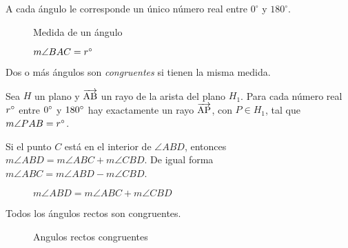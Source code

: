 \begin{postulate}
    A cada ángulo le corresponde un único número real entre $0^{\circ}$ y $180^{\circ}$.

\begin{figure}[!h]
    \centering
    
    \label{fig:angle-measure}
    \caption{Medida de un ángulo}
    \caption{$m\angle{BAC}=r^{\circ}$}
\end{figure}

\end{postulate}

\clearpage

\begin{definition}
    Dos o más ángulos son \textit{congruentes} si tienen la misma medida.
\end{definition}


\begin{postulate}
    Sea $H$ un plano y $\overrightarrow{\rm AB}$ un rayo de la arista del plano $H_1$. Para cada número real $r^{\circ}$ entre $0^{\circ}$ y $180^{\circ}$ hay exactamente un rayo $\overrightarrow{\rm AP}$, con $P \in H_1$, tal que $m\angle{PAB} = r^{\circ}$.

    \begin{figure}[!h]
        \centering
        
        \label{fig:angle-construction}
    \end{figure}
    
\end{postulate}

\begin{postulate}
    Si el punto $C$ está en el interior de $\angle{ABD}$, entonces $m\angle{ABD} = m\angle{ABC} + m\angle{CBD}$. De igual forma $m\angle{ABC} = m\angle{ABD} - m\angle{CBD}$.


    \begin{figure}[!h]
        \centering
        
        \label{fig:angle-addition}
        \caption{$m\angle{ABD} = m\angle{ABC} + m\angle{CBD}$}
    \end{figure}
    
\end{postulate}

\begin{postulate}
    Todos los ángulos rectos son congruentes.
    
    \begin{figure}[!h]
        \centering
        
        \caption{Angulos rectos congruentes}
        \label{fig:postulate14}
    \end{figure}
    
\end{postulate}

